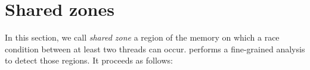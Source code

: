 \documentclass{frama-c-book}
\begin{document}
\section{Shared zones}
\begingroup
\label{sec:shared-vars}

\def \ifempty #1#2#3{\ifthenelse{\equal{#1}{}}{#2}{#3}}
\def\ri#1{\mathsf{Ri}(#1)}
\def\wi#1{\mathsf{Wi}(#1)}
\def\Zi{\mathsf{RWi}}
\def\Wp#1#2{\mathsf{Wp}^{#1}(#2)}
\def\Rp#1#2{\mathsf{Rp}^{#1}(#2)}
\def\live#1#2{\mathsf{live}(#1@#2)}
\def\shared#1{\mathsf{shared}\ifempty{#1}{}{(#1)}}


In this section, we call \emph{shared zone} a region of the memory on
which a race condition between at least two threads can occur.
%
\mthread performs a fine-grained analysis to detect those
regions. %
It proceeds as follows:
\end{document}
